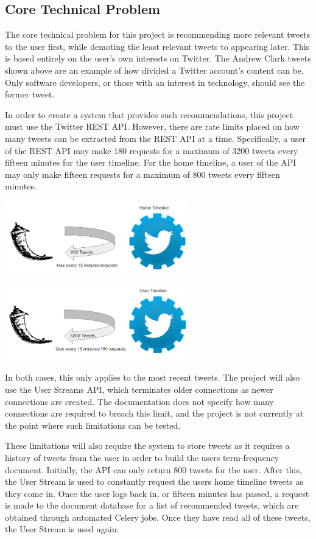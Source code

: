 \documentclass{article}
\begin{document}
\subsection{Core Technical Problem}

The core technical problem for this project is recommending more relevant tweets to the user first, while demoting the least relevant tweets to appearing later. This is based entirely on the user's own interests on Twitter. The Andrew Clark tweets shown above are an example of how divided a Twitter account's content can be. Only software developers, or those with an interest in technology, should see the former tweet.

In order to create a system that provides such recommendations, this project must use the Twitter REST API. However, there are rate limits placed on how many tweets can be extracted from the REST API at a time. Specifically, a user of the REST API may make 180 requests for a maximum of 3200 tweets every fifteen minutes for the user timeline. For the home timeline, a user of the API may only make fifteen requests for a maximum of 800 tweets every fifteen minutes. 

\includegraphics[width=0.6\textwidth,center]{rate_limit_1}

\includegraphics[width=0.6\textwidth,center]{rate_limit_2}

In both cases, this only applies to the most recent tweets. The project will also use the User Streams API, which terminates older connections as newer connections are created. The documentation does not specify how many connections are required to breach this limit, and the project is not currently at the point where such limitations can be tested.

These limitations will also require the system to store tweets as it requires a history of tweets from the user in order to build the users term-frequency document. Initially, the API can only return 800 tweets for the user. After this, the User Stream is used to constantly request the users home timeline tweets as they come in. Once the user logs back in, or fifteen minutes has passed, a request is made to the document database for a list of recommended tweets, which are obtained through automated Celery\cite{celery} jobs. Once they have read all of these tweets, the User Stream is used again.
\end{document}
